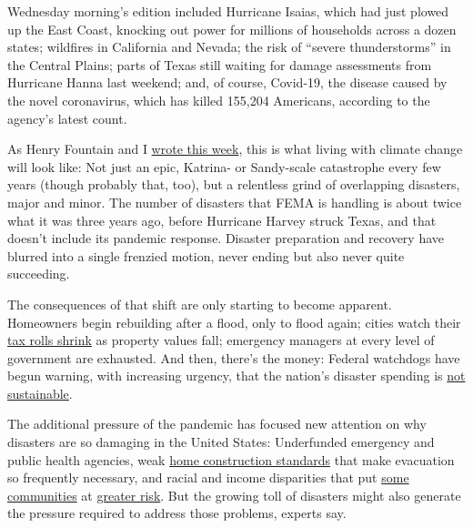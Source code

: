Wednesday morning's edition included Hurricane Isaias, which had just
plowed up the East Coast, knocking out power for millions of households
across a dozen states; wildfires in California and Nevada; the risk of
``severe thunderstorms'' in the Central Plains; parts of Texas still
waiting for damage assessments from Hurricane Hanna last weekend; and,
of course, Covid-19, the disease caused by the novel coronavirus, which
has killed 155,204 Americans, according to the agency's latest count.

As Henry Fountain and I
\href{https://www.nytimes.com/2020/08/04/climate/hurricane-isaias-apple-fire-climate.html?action=click\&module=Top\%20Stories\&pgtype=Homepage}{wrote
this week}, this is what living with climate change will look like: Not
just an epic, Katrina- or Sandy-scale catastrophe every few years
(though probably that, too), but a relentless grind of overlapping
disasters, major and minor. The number of disasters that FEMA is
handling is about twice what it was three years ago, before Hurricane
Harvey struck Texas, and that doesn't include its pandemic response.
Disaster preparation and recovery have blurred into a single frenzied
motion, never ending but also never quite succeeding.

The consequences of that shift are only starting to become apparent.
Homeowners begin rebuilding after a flood, only to flood again; cities
watch their
\href{https://www.bloomberg.com/news/features/2018-05-02/the-u-s-climate-strategy-of-total-retreat-is-failing?sref=UBrhZ1ro}{tax
rolls shrink} as property values fall; emergency managers at every level
of government are exhausted. And then, there's the money: Federal
watchdogs have begun warning, with increasing urgency, that the nation's
disaster spending is
\href{https://www.gao.gov/assets/710/702215.pdf}{not sustainable}.

The additional pressure of the pandemic has focused new attention on why
disasters are so damaging in the United States: Underfunded emergency
and public health agencies, weak
\href{https://www.nytimes.com/2019/10/26/climate/building-codes-secret-deal.html}{home
construction standards} that make evacuation so frequently necessary,
and racial and income disparities that put
\href{https://www.nytimes.com/2020/05/17/climate/pollution-poverty-coronavirus.html}{some
communities} at
\href{https://www.nytimes.com/2020/07/24/climate/houston-flooding-race.html}{greater
risk}. But the growing toll of disasters might also generate the
pressure required to address those problems, experts say.

